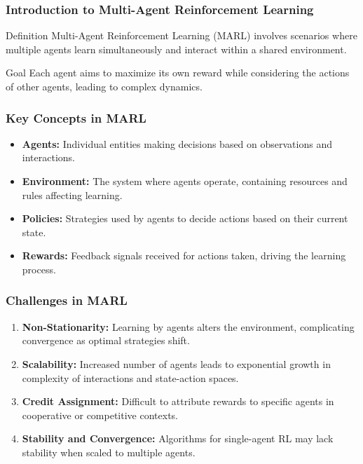 \documentclass{beamer}
\begin{document}
\begin{frame}[fragile]
    \frametitle{Introduction to Multi-Agent Reinforcement Learning}
    \begin{block}{Definition}
        Multi-Agent Reinforcement Learning (MARL) involves scenarios where multiple agents learn simultaneously and interact within a shared environment.
    \end{block}
    \begin{block}{Goal}
        Each agent aims to maximize its own reward while considering the actions of other agents, leading to complex dynamics.
    \end{block}
\end{frame}

\begin{frame}[fragile]
    \frametitle{Key Concepts in MARL}
    \begin{itemize}
        \item \textbf{Agents:} Individual entities making decisions based on observations and interactions.
        \item \textbf{Environment:} The system where agents operate, containing resources and rules affecting learning.
        \item \textbf{Policies:} Strategies used by agents to decide actions based on their current state.
        \item \textbf{Rewards:} Feedback signals received for actions taken, driving the learning process.
    \end{itemize}
\end{frame}

\begin{frame}[fragile]
    \frametitle{Challenges in MARL}
    \begin{enumerate}
        \item \textbf{Non-Stationarity:} Learning by agents alters the environment, complicating convergence as optimal strategies shift.
        \item \textbf{Scalability:} Increased number of agents leads to exponential growth in complexity of interactions and state-action spaces.
        \item \textbf{Credit Assignment:} Difficult to attribute rewards to specific agents in cooperative or competitive contexts.
        \item \textbf{Stability and Convergence:} Algorithms for single-agent RL may lack stability when scaled to multiple agents.
    \end{enumerate}
\end{frame}
\end{document}
